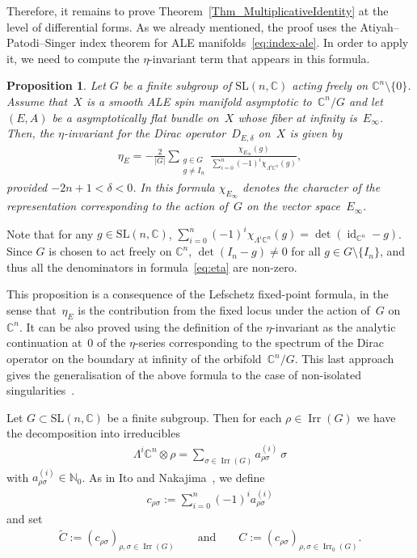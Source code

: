 \documentclass[pdftex]{sigma}
\numberwithin{equation}{section}
\newcommand{\N}{{\mathbb N}}
\newcommand{\C}{{\mathbb C}}
\newcommand{\SL}{\mathrm{SL}}
\newcommand{\Irr}{\operatorname{Irr}}
\newcommand{\id}{\operatorname{id}}
\newtheorem{Proposition}[Theorem]{Proposition}
 { \theoremstyle{definition}
\newtheorem{Definition}[Theorem]{Definition}
\newtheorem{Remark}[Theorem]{Remark} }
\begin{document}
Therefore, it remains to prove Theorem~\ref{Thm_MultiplicativeIdentity} at the level of
dif\/ferential forms.  As we already mentioned, the proof uses the
Atiyah--Patodi--Singer index theorem for ALE
manifolds~\eqref{eq:index-ale}. In order to apply it, we need to
compute the $\eta$-invariant term that appears in this formula.

\begin{Proposition}
  Let $G$ be a finite subgroup of $\SL(n,\C)$ acting freely on $\C^n
  {\setminus} \{0\}$. Assume that~$X$ is a smooth ALE spin manifold
  asymptotic to~$\C^n/G$ and let~$(E,A)$ be a asymptotically flat
  bundle on~$X$ whose fiber at infinity is~$E_{\infty}$. Then, the
  $\eta$-invariant for the Dirac operator~$D_{E,\delta}$ on~$X$ is
  given by
  \begin{gather}\label{eq:eta}
    \eta_E = -\frac{2}{|G|} \sum_{\substack{g \in G \\ g \neq I_n}}
    \frac{\chi_{E_{\infty}} (g)}{\sum\limits_{i=0}^n (-1)^i \chi_{\Lambda^i\C^n}(g)},
  \end{gather}
  provided $-2n+1<\delta <0$.  In this formula $\chi_{E_{\infty}}$ denotes the
  character of the representation corresponding to the action of~$G$
  on the vector space~$E_{\infty}$.
\end{Proposition}

\begin{Remark}
  Note that for any $g\in \SL(n,\C)$, $\sum\limits_{i=0}^n (-1)^i
  \chi_{\Lambda^i\C^n} (g) = \det(\id_{\C^n}-g)$. Since $G$ is chosen to act
  freely on $\C^n$, $\det(I_n-g) \neq 0$ for all $g \in G{\setminus}
  \{I_n\}$, and thus all the denominators in formula~\eqref{eq:eta} are
  non-zero.
\end{Remark}

This proposition is a consequence of the Lefschetz f\/ixed-point
formula, in the sense that~$\eta_E$ is the contribution from the f\/ixed
locus under the action of~$G$ on~$\C^n$. It can be also proved using
the def\/inition of the $\eta$-invariant as the analytic continuation at~$0$ of the $\eta$-series correspon\-ding to the spectrum of the Dirac
operator on the boundary at inf\/inity of the orbi\-fold~$\C^n/G$.  This
last approach gives the generalisation of the above formula to the
case of non-isolated singularities~\cite{Degeratu2001}.

Let $G\subset\SL(n,\C)$ be a f\/inite subgroup.  Then for each $\rho\in
\Irr(G)$ we have the decomposition into irreducibles
\begin{gather}\label{eq:vr}
  \Lambda^i\C^n \otimes \rho
    = \sum_{\sigma \in \Irr(G)} a^{(i)}_{\rho\sigma}\ \sigma
\end{gather}
with $a^{(i)}_{\rho\sigma}\in\N_0$.  As in Ito and
Nakajima~\cite{Ito2000}, we def\/ine
\begin{gather}\label{eq:cartan}
  c_{\rho\sigma} := \sum_{i=0}^n (-1)^i a_{\rho\sigma}^{(i)}
\end{gather}
and set
\begin{gather}
  \label{Eq_C}
  \tilde C:=(c_{\rho\sigma})_{\rho,\sigma \in \Irr(G)} \qquad\text{and}\qquad
  C:=(c_{\rho\sigma})_{\rho,\sigma \in \Irr_0(G)}.
\end{gather}
\end{document}
